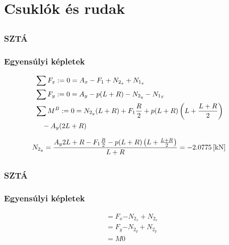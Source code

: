 \section{Csuklók és rudak}

\subsection{}

\subsubsection{SZTÁ}

\subsubsection{Egyensúlyi képletek}
\begin{align*}
    &\sum{F_x} := 0 = A_x - F_1 + N_{2_x} + N_{1_x} \\
    &\sum{F_y} := 0 = A_y - p(L+R) - N_{2_y} - N_{1_Y} \\
    &\sum{M^B} := 0 = N_{2_y}(L+R) + F_1 \frac{R}{2} + p(L+R)\left(L+\frac{L+R}{2}\right) \nonumber \\
    &\quad - A_y (2L+R)
\end{align*}

\begin{equation*}
	N_{2_y} = \frac{A_y{2L+R} - F_1 \frac{R}{2} - p(L+R)\left(L+\frac{L+R}{2}\right)}{L+R} = \SI{-2.0775}{[\kilo\newton]}
\end{equation*}

\newpage

\subsection{}

\subsubsection{SZTÁ}

\subsubsection{Egyensúlyi képletek}
\begin{align*}
    &\equal{F_x}{- N_{2_x} + N_{2_x}} \\
    &\equal{F_y}{- N_{2_y} + N_{2_y}} \\
    &\equal{M}{0}
\end{align*}

